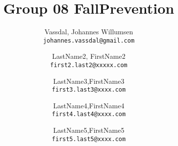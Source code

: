 \documentclass[12pt,a4paper]{report}
\title{Group 08 FallPrevention}
\author{
  Vassdal, Johannes Willumsen\\
  \texttt{johannes.vassdal@gmail.com}
  \and
  LastName2, FirstName2\\
  \texttt{first2.last2@xxxxx.com}
  \and
  LastName3,FirstName3\\
  \texttt{first3.last3@xxxx.com}
    \and
  LastName4,FirstName4\\
  \texttt{first4.last4@xxxx.com}
    \and
  LastName5,FirstName5\\
  \texttt{first5.last5@xxxx.com}
}
\begin{document}
\onehalfspacing
\maketitle
\tableofcontents








\end{document}
